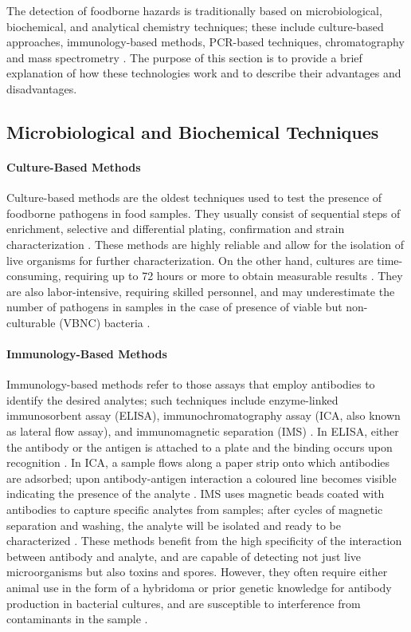 The detection of foodborne hazards is traditionally based on microbiological, biochemical, and analytical chemistry techniques; these include culture-based approaches, immunology-based methods, PCR-based techniques, chromatography and mass spectrometry \citep{velusamyOverview2010,iammarinoAdvanced2022}. The purpose of this section is to provide a brief explanation of how these technologies work and to describe their advantages and disadvantages.

\subsection{Microbiological and Biochemical Techniques}
\label{sec:microbiological_detection}

\paragraph{Culture-Based Methods}
Culture-based methods are the oldest techniques used to test the presence of foodborne pathogens in food samples. They usually consist of sequential steps of enrichment, selective and differential plating, confirmation and strain characterization \citep{kabirazConventional2023}.
These methods are highly reliable and allow for the isolation of live organisms for further characterization. On the other hand, cultures are time-consuming, requiring up to 72 hours or more to obtain measurable results \citep{saravananMethods2021}. They are also labor-intensive, requiring skilled personnel, and may underestimate the number of pathogens in samples in the case of presence of viable but non-culturable (VBNC) bacteria \citep{liImportance2014}.

\paragraph{Immunology-Based Methods}
Immunology-based methods refer to those assays that employ antibodies to identify the desired analytes; such techniques include enzyme-linked immunosorbent assay (ELISA), immunochromatography assay (ICA, also known as lateral flow assay), and immunomagnetic separation (IMS) \citep{gaoResearch2024}. In ELISA, either the antibody or the antigen is attached to a plate and the binding occurs upon recognition \citep{engvallEnzymelinked1971}. In ICA, a sample flows along a paper strip onto which antibodies are adsorbed; upon antibody-antigen interaction a coloured line becomes visible indicating the presence of the analyte \citep{zengImmunochromatographic2021}.
IMS uses magnetic beads coated with antibodies to capture specific analytes from samples; after cycles of magnetic separation and washing, the analyte will be isolated and ready to be characterized \citep{moyanoMagnetic2019, gagicFully2020}.
These methods benefit from the high specificity of the interaction between antibody and analyte, and are capable of detecting not just live microorganisms but also toxins and spores. However, they often require either animal use in the form of a hybridoma or prior genetic knowledge for antibody production in bacterial cultures, and are susceptible to interference from contaminants in the sample \citep{velusamyOverview2010}.

